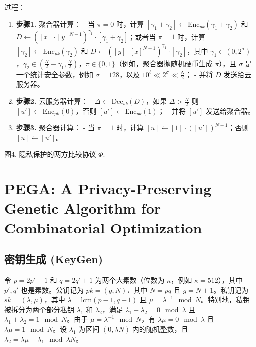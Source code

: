 过程：
\begin{enumerate}[leftmargin=*, nosep]
    \item \textbf{步骤1.} 聚合器计算：
    - 当 \(\pi = 0\) 时，计算 \([\gamma_1 + \gamma_2] \leftarrow \text{Enc}_{pk}(\gamma_1 + \gamma_2)\) 和 \(D \leftarrow ([x] \cdot [y]^{N-1})^{\gamma_1} \cdot [\gamma_1 + \gamma_2]\)；或者当 \(\pi = 1\) 时，计算 \([\gamma_2] \leftarrow \text{Enc}_{pk}(\gamma_2)\) 和 \(D \leftarrow ([y] \cdot [x]^{N-1})^{\gamma_1} \cdot [\gamma_2]\)，其中 \(\gamma_1 \in (0, 2^\sigma)\)，\(\gamma_2 \in (\frac{N}{2} - \gamma_1, \frac{N}{2})\)，\(\pi \in \{0, 1\}\)（例如，聚合器抛随机硬币生成 \(\pi\)），且 \(\sigma\) 是一个统计安全参数，例如 \(\sigma = 128\)，以及 \(10^\ell \ll 2^\sigma \ll \frac{N}{2}\)；
    - 并将 \(D\) 发送给云服务器。
    
    \item \textbf{步骤2.} 云服务器计算：
    - \(\Delta \leftarrow \text{Dec}_{sk}(D)\)，如果 \(\Delta > \frac{N}{2}\) 则 \([u'] \leftarrow \text{Enc}_{pk}(0)\)，否则 \([u'] \leftarrow \text{Enc}_{pk}(1)\)；
    - 并将 \([u']\) 发送给聚合器。
    
    \item \textbf{步骤3.} 聚合器计算：
    - 当 \(\pi = 1\) 时，计算 \([u] \leftarrow [1] \cdot ([u'])^{N-1}\)；否则 \([u] \leftarrow [u']\)。
\end{enumerate}

图4. 隐私保护的两方比较协议 \(\Phi\).



\section{PEGA: A Privacy-Preserving Genetic Algorithm  for Combinatorial Optimization}

\subsection{密钥生成 (KeyGen)}  
令 \( p = 2p' + 1 \) 和 \( q = 2q' + 1 \) 为两个大素数（位数为 \( \kappa \)，例如 \( \kappa = 512 \)），其中 \( p', q' \) 也是素数。公钥记为 \( pk = (g, N) \)，其中 \( N = pq \) 且 \( g = N + 1 \)。私钥记为 \( sk = (\lambda, \mu) \)，其中 \( \lambda = \text{lcm}(p - 1, q - 1) \) 且 \( \mu = \lambda^{-1} \mod N \)。特别地，私钥被拆分为两个部分私钥 \( \lambda_1 \) 和 \( \lambda_2 \)，满足 \( \lambda_1 + \lambda_2 = 0 \mod \lambda \) 且 \( \lambda_1 + \lambda_2 = 1 \mod N \)。由于 \( \mu = \lambda^{-1} \mod N \)，有 \( \lambda \mu = 0 \mod \lambda \) 且 \( \lambda \mu = 1 \mod N \)。设 \( \lambda_1 \) 为区间 \( (0, \lambda N) \) 内的随机整数，且 \( \lambda_2 = \lambda \mu - \lambda_1 \mod \lambda N \)。

